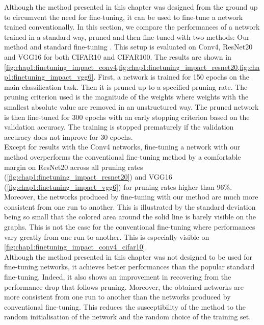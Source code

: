 Although the method presented in this chapter was designed from the ground up to
circumvent the need for fine-tuning, it can be used to fine-tune a network
trained conventionally. In this section, we compare the performances of a
network trained in a standard way, pruned and then fine-tuned with two methods:
Our method and standard fine-tuning \cite{DBLP:conf/nips/HanPTD15}. This setup
is evaluated on Conv4, ResNet20 and VGG16 for both CIFAR10 and CIFAR100. The
results are shown in 
\cref{fig:chap1:finetuning_impact_conv4,fig:chap1:finetuning_impact_resnet20,fig:chap1:finetuning_impact_vgg6}.
First, a network is trained for 150 epochs on the main classification task. Then
it is pruned up to a specified pruning rate. The pruning criterion used is the
magnitude of the weights where weights with the smallest absolute value are
removed in an unstructured way. The pruned network is then fine-tuned for 300
epochs with an early stopping criterion based on the validation accuracy. The
training is stopped prematurely if the validation accuracy does not improve for
30 epochs. \\

Except for results with the Conv4 networks, fine-tuning a network with our
method overperforms the conventional fine-tuning method by a comfortable margin
on ResNet20 across all pruning rates (\cref{fig:chap1:finetuning_impact_resnet20}) and VGG16
(\cref{fig:chap1:finetuning_impact_vgg6}) for pruning rates higher than 96\%.
Moreover, the networks produced by fine-tuning with our method are much more
consistent from one run to another. This is illustrated by the standard
deviation being so small that the colored area around the solid line is barely
visible on the graphs. This is not the case for the conventional fine-tuning
where performances vary greatly from one run to another. This is especially
visible on \cref{fig:chap1:finetuning_impact_conv4_cifar10}.\\

Although the method presented in this chapter was not designed to be used for
fine-tuning networks, it achieves better performances than the popular standard
fine-tuning. Indeed, it also shows an improvement in recovering from the performance drop
that follows pruning. Moreover, the obtained networks are more consistent from
one run to another than the networks produced by conventional fine-tuning. This
reduces the susceptibility of the method to the random initialisation of the
network and the random choice of the training set. \\ 

